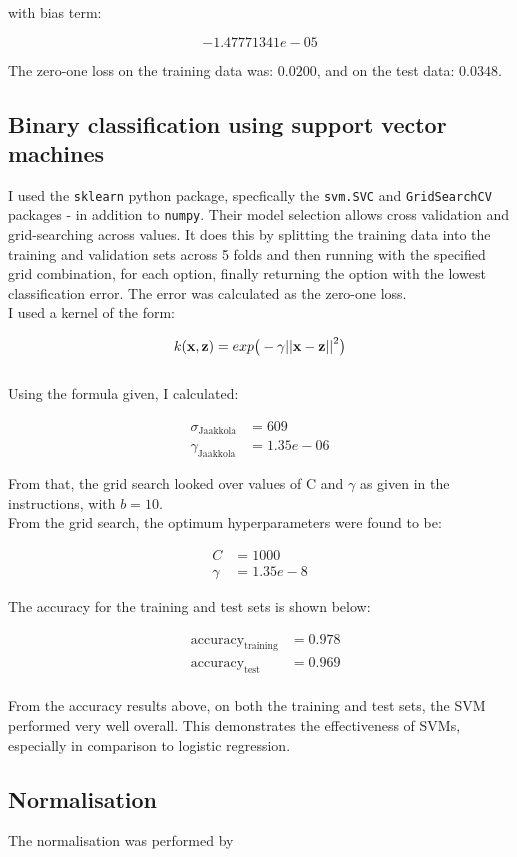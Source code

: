 \documentclass{scrartcl}
\begin{document}
with bias term:

\[ -1.47771341e-05 \]

The zero-one loss on the training data was: $0.0200$, and on the test data: $0.0348$.

\subsection{Binary classification using support vector machines}
I used the \texttt{sklearn} python package, specfically the \texttt{svm.SVC} and \texttt{GridSearchCV} packages - in addition to \texttt{numpy}. Their model selection allows cross validation and grid-searching across values. It does this by splitting the training data into the training and validation sets across 5 folds and then running with the specified grid combination, for each option, finally returning the option with the lowest classification error. The error was calculated as the zero-one loss.\\

I used a kernel of the form:

\[ k({\mathbf x}, {\mathbf z}) = exp \big(-\gamma {|| {\mathbf x}- {\mathbf z}||}^2\big) \] \\

\newpage
Using the formula given, I calculated:

\begin{align*}
    \sigma_{\text{Jaakkola}} &= 609 \\
    \gamma_{\text{Jaakkola}} &= 1.35e-06
\end{align*}

From that, the grid search looked over values of C and $\gamma$ as given in the instructions, with $b = 10$. \\

From the grid search, the optimum hyperparameters were found to be:

\begin{align*}
    C &= 1000 \\
    \gamma &= 1.35e-8
\end{align*}

The accuracy for the training and test sets is shown below:

\begin{align*}
    & \text{accuracy}_{\text{training}}   &= 0.978 \\
    & \text{accuracy}_{\text{test}}       &= 0.969 \\
\end{align*}

From the accuracy results above, on both the training and test sets, the SVM performed very well overall. This demonstrates the effectiveness of SVMs, especially in comparison to logistic regression.

\subsection{Normalisation}

The normalisation was performed by

%
\end{document}
